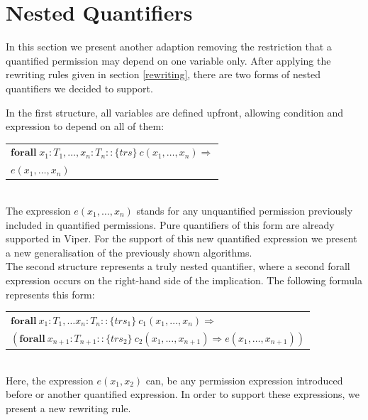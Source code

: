 \documentclass[12pt]{article}
\begin{document}
\section{Nested Quantifiers}
\label{nq}
In this section we present another adaption removing the restriction that a quantified permission may depend on one variable only. After applying the rewriting rules given in section \ref{rewriting}, there are two forms of nested quantifiers we decided to support.

In the first structure, all variables are defined upfront, allowing condition and expression to depend on all of them:\\

\begin{tabularx}{1\textwidth}{ X }
	\( \mathbf{forall} \; x_1:T_1, \dots, x_n: T_n ::  \{trs\}\ c(x_1, \dots, x_n) \Rightarrow \) \\
	\(e(x_1,  \dots, x_n)\)
\end{tabularx}\\

The expression \(e(x_1,  \dots, x_n)\) stands for any unquantified permission previously included in quantified permissions. Pure quantifiers of this form are already supported in Viper. For the support of this new quantified expression we present a new generalisation of the previously shown algorithms.\\

The second structure represents a truly nested quantifier, where a second forall expression occurs on the right-hand side of the implication. The following formula represents this form:\\

\begin{tabularx}{1\textwidth}{ X}
      \(\mathbf{forall \ }  x_1:T_1, \dots x_n:T_n ::  \{trs_1\}\  c_1(x_1, \dots, x_n) \Rightarrow \) \\
     \( ( \mathbf{forall \ } x_{n+1}:T_{n+1} :: \{trs_2\} \ c_2(x_1, \dots, x_{n+1}) \Rightarrow e(x_1, \dots, x_{n+1}))\)
\end{tabularx}\\

Here, the expression \(e(x_1, x_2)\) can, be any permission expression introduced before or another quantified expression. In order to support these expressions, we present a new rewriting rule.
\end{document}
